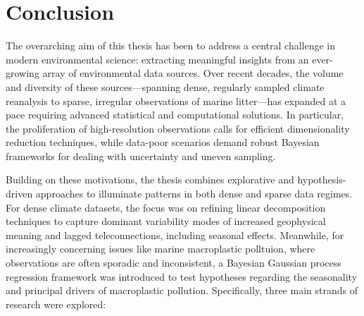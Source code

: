 \ifpdf
    \graphicspath{{content/chapter9/figs/raster/}{content/chapter9/figs/pdf/}{content/chapter9/figs/}}
\else
    \graphicspath{{content/chapter9/figs/vector/}{content/chapter9/figs/}}
\fi

\chapter{Conclusion}\label{chapter:conclusion}


The overarching aim of this thesis has been to address a central challenge in modern environmental science: extracting meaningful insights from an ever-growing array of environmental data sources. Over recent decades, the volume and diversity of these sources---spanning dense, regularly sampled climate reanalysis to sparse, irregular observations of marine litter---has expanded at a pace requiring advanced statistical and computational solutions. In particular, the proliferation of high-resolution observations calls for efficient dimensionality reduction techniques, while data-poor scenarios demand robust Bayesian frameworks for dealing with uncertainty and uneven sampling.

Building on these motivations, the thesis combines explorative and hypothesis-driven approaches to illuminate patterns in both dense and sparse data regimes. For dense climate datasets, the focus was on refining linear decomposition techniques to capture dominant variability modes of increased geophysical meaning and lagged teleconnections, including seasonal effects. Meanwhile, for increasingly concerning issues like marine macroplastic polltuion, where observations are often sporadic and inconsistent, a Bayesian Gaussian process regression framework was introduced to test hypotheses regarding the seasonality and principal drivers of macroplastic pollution. Specifically, three main strands of research were explored:


